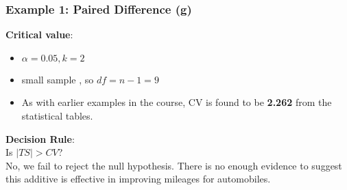 \documentclass[a4]{beamer}
\begin{document}
\begin{frame}
\frametitle{Example 1: Paired Difference (g)}
\textbf{Critical value}:
\begin{itemize}
\item $\alpha = 0.05, k = 2$ \item small sample , so $df = n-1 = 9$
\item As with earlier examples in the course, CV is found to be \textbf{2.262} from the statistical tables.
\end{itemize}
\bigskip
\textbf{Decision Rule}:\\
Is $|TS| > CV$? \\ No, we fail to reject the null hypothesis.
There is no enough evidence to suggest this additive is effective in improving mileages for automobiles.
\end{frame}
\end{document}
